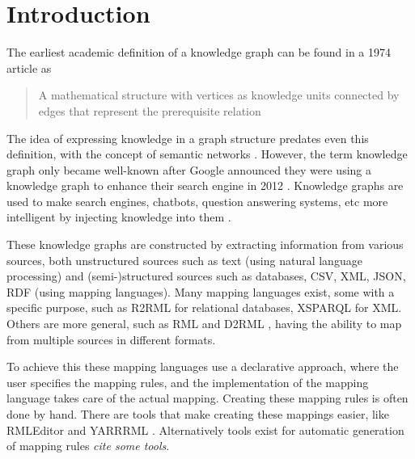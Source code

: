 
\chapter{Introduction}
\label{chapter:introduction}


The earliest academic definition of a knowledge graph can be found in a 1974 article as \begin{quote}
    A mathematical structure with vertices as knowledge units connected by edges that represent the prerequisite relation \citep{Marchi1974,bergman2019common}
\end{quote} 

The idea of expressing knowledge in a graph structure predates even this definition, with the concept of semantic networks \citep{Richens1956PreprogrammingFM}. %
However, the term knowledge graph only became well-known after Google announced they were using a knowledge graph to enhance their search engine in 2012 \citep{singhal2012introducing}. 
Knowledge graphs are used to make search engines, chatbots, question answering systems, etc more intelligent by injecting knowledge into them \citep{SurveyOnKGs}. 

These knowledge graphs are constructed by extracting information from various sources, both unstructured sources such as text (using natural language processing) and (semi-)structured sources such as databases, CSV, XML, JSON, RDF (using mapping languages). Many mapping languages exist, some with a specific purpose, such as R2RML \citep{Das:12:RRR} for relational databases, XSPARQL \citep{Bischof2012} for XML. Others are more general, such as RML \citep{dimou_ldow_2014} and D2RML \citep{Chortaras2018D2RMLIH}, having the ability to map from multiple sources in different formats. 

To achieve this these mapping languages use a declarative approach, where the user specifies the mapping rules, and the implementation of the mapping language takes care of the actual mapping. Creating these mapping rules is often done by hand. There are tools that make creating these mappings easier, like RMLEditor \citep{heyvaert_jws_2018} and YARRRML \citep{10.1007/978-3-319-98192-5_40}. Alternatively tools exist for automatic generation of mapping rules \textit{cite some tools}.

